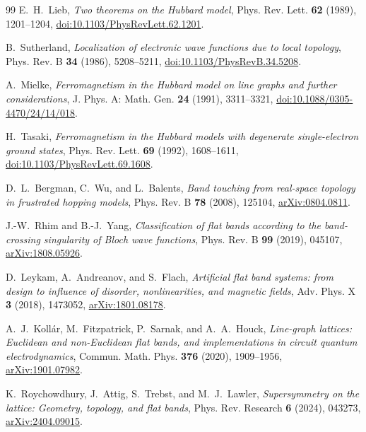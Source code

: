 \documentclass[11pt,a4paper]{article}
\theoremstyle{definition}
\begin{document}
\begin{thebibliography}{99}
E.~H.~Lieb,
\emph{Two theorems on the Hubbard model},
Phys. Rev. Lett. \textbf{62} (1989), 1201--1204,
\href{https://doi.org/10.1103/PhysRevLett.62.1201}{doi:10.1103/PhysRevLett.62.1201}.

B.~Sutherland,
\emph{Localization of electronic wave functions due to local topology},
Phys. Rev. B \textbf{34} (1986), 5208--5211,
\href{https://doi.org/10.1103/PhysRevB.34.5208}{doi:10.1103/PhysRevB.34.5208}.

A.~Mielke,
\emph{Ferromagnetism in the Hubbard model on line graphs and further considerations},
J. Phys. A: Math. Gen. \textbf{24} (1991), 3311--3321,
\href{https://doi.org/10.1088/0305-4470/24/14/018}{doi:10.1088/0305-4470/24/14/018}.

H.~Tasaki,
\emph{Ferromagnetism in the Hubbard models with degenerate single-electron ground states},
Phys. Rev. Lett. \textbf{69} (1992), 1608--1611,
\href{https://doi.org/10.1103/PhysRevLett.69.1608}{doi:10.1103/PhysRevLett.69.1608}.

D.~L.~Bergman, C.~Wu, and L.~Balents,
\emph{Band touching from real-space topology in frustrated hopping models},
Phys. Rev. B \textbf{78} (2008), 125104,
\href{https://arxiv.org/abs/0804.0811}{arXiv:0804.0811}.

J.-W.~Rhim and B.-J.~Yang,
\emph{Classification of flat bands according to the band-crossing singularity of Bloch wave functions},
Phys. Rev. B \textbf{99} (2019), 045107,
\href{https://arxiv.org/abs/1808.05926}{arXiv:1808.05926}.

D.~Leykam, A.~Andreanov, and S.~Flach,
\emph{Artificial flat band systems: from design to influence of disorder, nonlinearities, and magnetic fields},
Adv. Phys. X \textbf{3} (2018), 1473052,
\href{https://arxiv.org/abs/1801.08178}{arXiv:1801.08178}.

A.~J.~Koll\'ar, M.~Fitzpatrick, P.~Sarnak, and A.~A.~Houck,
\emph{Line-graph lattices: Euclidean and non-Euclidean flat bands, and implementations in circuit quantum electrodynamics},
Commun. Math. Phys. \textbf{376} (2020), 1909--1956,
\href{https://arxiv.org/abs/1901.07982}{arXiv:1901.07982}.

K.~Roychowdhury, J.~Attig, S.~Trebst, and M.~J.~Lawler,
\emph{Supersymmetry on the lattice: Geometry, topology, and flat bands},
Phys. Rev. Research \textbf{6} (2024), 043273,
\href{https://arxiv.org/abs/2404.09015}{arXiv:2404.09015}.


\end{thebibliography}
\end{document}
